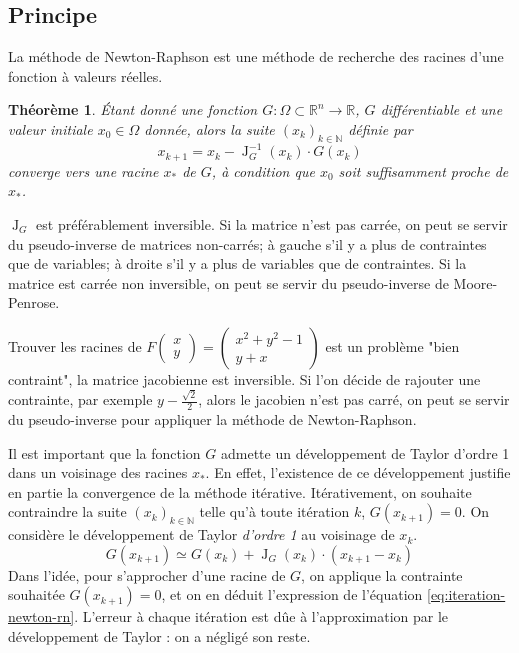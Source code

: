 \documentclass[3p, twocolumn]{elsarticle}
\DeclareMathOperator{\Jacobian}{J}
\newtheorem{thm}{Théorème}
\begin{document}
\subsection{Principe}
La méthode de Newton-Raphson est une méthode de recherche des racines d'une fonction à valeurs réelles.
\begin{thm}
    \'Etant donné une fonction $G: \Omega\subset\mathbb{R}^n\longrightarrow \mathbb{R}$, $G$ différentiable et une valeur initiale $x_0\in \Omega$ donnée, alors la suite $(x_k)_{k\in \mathbb{N}}$ définie par
    \begin{equation}
        x_{k+1} = x_k - \Jacobian^{-1}_G(x_k)\cdot G(x_k)
        \label{eq:iteration-newton-rn}
    \end{equation}
    converge vers une racine $x_*$ de $G$, à condition que $x_0$ soit suffisamment proche de $x_*$.
\end{thm}
\begin{rmk}
    $\Jacobian_G$ est préférablement inversible. Si la matrice n'est pas carrée, on peut se servir du pseudo-inverse de matrices non-carrés; à gauche s'il y a plus de contraintes que de variables; à droite s'il y a plus de variables que de contraintes. Si la matrice est carrée non inversible, on peut se servir du pseudo-inverse de Moore-Penrose.
    \begin{exemple}
        Trouver les racines de $F
        \begin{pmatrix}
            x\\y
        \end{pmatrix}
        =
        \begin{pmatrix}
            x^2+y^2-1\\
            y+x
        \end{pmatrix}$ est un problème "bien contraint", la matrice jacobienne est inversible. Si l'on décide de rajouter une contrainte, par exemple $y-\frac{\sqrt2}{2}$, alors le jacobien n'est pas carré, on peut se servir du pseudo-inverse pour appliquer la méthode de Newton-Raphson.
    \end{exemple}
\end{rmk}
\begin{rmk}
    Il est important que la fonction $G$ admette un développement de Taylor d'ordre 1 dans un voisinage des racines $x_*$. En effet, l'existence de ce développement justifie en partie la convergence de la méthode itérative. Itérativement, on souhaite contraindre la suite $(x_k)_{k\in \mathbb{N}}$ telle qu'à toute itération $k$, $G(x_{k+1})=0$. On considère le développement de Taylor \textit{d'ordre 1} au voisinage de $x_{k}$.
    \begin{equation*}
        G(x_{k+1})\simeq G(x_k)+\Jacobian_G(x_k)\cdot(x_{k+1}-x_k)
    \end{equation*}
    Dans l'idée, pour s'approcher d'une racine de $G$, on applique la contrainte souhaitée $G(x_{k+1})=0$, et on en déduit l'expression de l'équation \ref{eq:iteration-newton-rn}. L'erreur à chaque itération est dûe à l'approximation par le développement de Taylor : on a négligé son reste.
\end{rmk}
\end{document}
